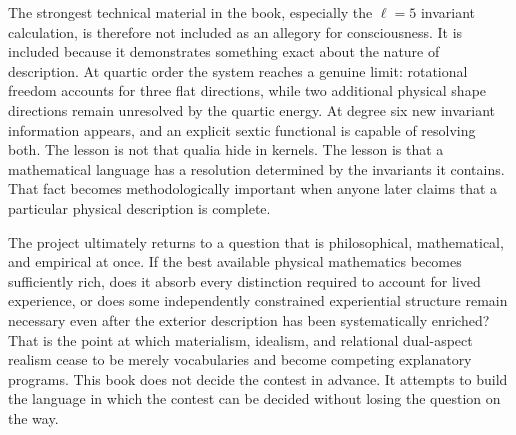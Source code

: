 The strongest technical material in the book, especially the $\ell=5$ invariant calculation, is therefore not included as an allegory for consciousness. It is included because it demonstrates something exact about the nature of description. At quartic order the system reaches a genuine limit: rotational freedom accounts for three flat directions, while two additional physical shape directions remain unresolved by the quartic energy. At degree six new invariant information appears, and an explicit sextic functional is capable of resolving both. The lesson is not that qualia hide in kernels. The lesson is that a mathematical language has a resolution determined by the invariants it contains. That fact becomes methodologically important when anyone later claims that a particular physical description is complete.

The project ultimately returns to a question that is philosophical, mathematical, and empirical at once. If the best available physical mathematics becomes sufficiently rich, does it absorb every distinction required to account for lived experience, or does some independently constrained experiential structure remain necessary even after the exterior description has been systematically enriched? That is the point at which materialism, idealism, and relational dual-aspect realism cease to be merely vocabularies and become competing explanatory programs. This book does not decide the contest in advance. It attempts to build the language in which the contest can be decided without losing the question on the way.
